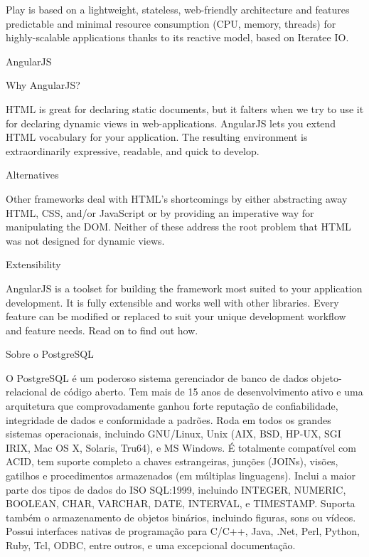 \documentclass{article}
\begin{document}
Play is based on a lightweight, stateless, web-friendly architecture and features predictable and minimal resource consumption (CPU, memory, threads) for highly-scalable applications thanks to its reactive model, based on Iteratee IO.

AngularJS

Why AngularJS?

HTML is great for declaring static documents, but it falters when we try to use it for declaring dynamic views in web-applications. AngularJS lets you extend HTML vocabulary for your application. The resulting environment is extraordinarily expressive, readable, and quick to develop.

Alternatives

Other frameworks deal with HTML’s shortcomings by either abstracting away HTML, CSS, and/or JavaScript or by providing an imperative way for manipulating the DOM. Neither of these address the root problem that HTML was not designed for dynamic views.

Extensibility

AngularJS is a toolset for building the framework most suited to your application development. It is fully extensible and works well with other libraries. Every feature can be modified or replaced to suit your unique development workflow and feature needs. Read on to find out how.

Sobre o PostgreSQL

O PostgreSQL é um poderoso sistema gerenciador de banco de dados objeto-relacional de código aberto.  Tem mais de 15 anos de desenvolvimento ativo e uma arquitetura que comprovadamente ganhou forte reputação de confiabilidade, integridade de dados e conformidade a padrões.  Roda em todos os grandes sistemas operacionais, incluindo GNU/Linux, Unix (AIX, BSD, HP-UX, SGI IRIX, Mac OS X, Solaris, Tru64), e MS Windows. É totalmente compatível com ACID, tem suporte completo a chaves estrangeiras, junções (JOINs), visões, gatilhos e procedimentos armazenados (em múltiplas linguagens).  Inclui a maior parte dos tipos de dados do ISO SQL:1999, incluindo INTEGER, NUMERIC, BOOLEAN, CHAR, VARCHAR, DATE, INTERVAL, e TIMESTAMP.  Suporta também o armazenamento de objetos binários, incluindo figuras, sons ou vídeos.  Possui interfaces nativas de programação para C/C++, Java, .Net, Perl, Python, Ruby, Tcl, ODBC, entre outros, e uma excepcional documentação.
\end{document}
